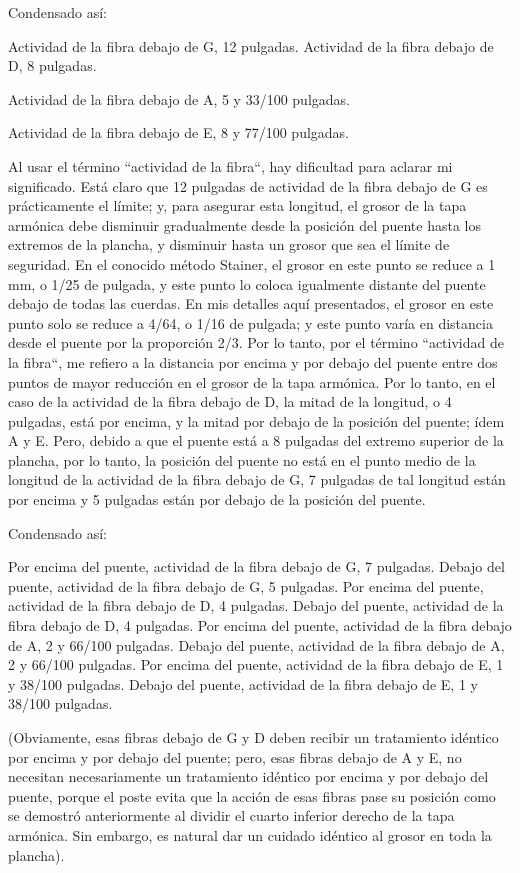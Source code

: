 \documentclass[12pt]{book}
\begin{document}
Condensado así:

Actividad de la fibra debajo de G, 12 pulgadas. Actividad de la fibra debajo de D, 8 pulgadas.

Actividad de la fibra debajo de A, 5 y 33/100 pulgadas.

Actividad de la fibra debajo de E, 8 y 77/100 pulgadas.

Al usar el término ``actividad de la fibra``, hay dificultad para aclarar mi significado. Está claro que 12 pulgadas de actividad de la fibra debajo de G es prácticamente el límite; y, para asegurar esta longitud, el grosor de la tapa armónica debe disminuir gradualmente desde la posición del puente hasta los extremos de la plancha, y disminuir hasta un grosor que sea el límite de seguridad. En el conocido método Stainer, el grosor en este punto se reduce a 1 mm, o 1/25 de pulgada, y este punto lo coloca igualmente distante del puente debajo de todas las cuerdas. En mis detalles aquí presentados, el grosor en este punto solo se reduce a 4/64, o 1/16 de pulgada; y este punto varía en distancia desde el puente por la proporción 2/3. Por lo tanto, por el término ``actividad de la fibra``, me refiero a la distancia por encima y por debajo del puente entre dos puntos de mayor reducción en el grosor de la tapa armónica. Por lo tanto, en el caso de la actividad de la fibra debajo de D, la mitad de la longitud, o 4 pulgadas, está por encima, y la mitad por debajo de la posición del puente; ídem A y E. Pero, debido a que el puente está a 8 pulgadas del extremo superior de la plancha, por lo tanto, la posición del puente no está en el punto medio de la longitud de la actividad de la fibra debajo de G, 7 pulgadas de tal longitud están por encima y 5 pulgadas están por debajo de la posición del puente.

Condensado así:

Por encima del puente, actividad de la fibra debajo de G, 7 pulgadas. Debajo del puente, actividad de la fibra debajo de G, 5 pulgadas. Por encima del puente, actividad de la fibra debajo de D, 4 pulgadas. Debajo del puente, actividad de la fibra debajo de D, 4 pulgadas. Por encima del puente, actividad de la fibra debajo de A, 2 y 66/100 pulgadas. Debajo del puente, actividad de la fibra debajo de A, 2 y 66/100 pulgadas. Por encima del puente, actividad de la fibra debajo de E, 1 y 38/100 pulgadas. Debajo del puente, actividad de la fibra debajo de E, 1 y 38/100 pulgadas.

(Obviamente, esas fibras debajo de G y D deben recibir un tratamiento idéntico por encima y por debajo del puente; pero, esas fibras debajo de A y E, no necesitan necesariamente un tratamiento idéntico por encima y por debajo del puente, porque el poste evita que la acción de esas fibras pase su posición como se demostró anteriormente al dividir el cuarto inferior derecho de la tapa armónica. Sin embargo, es natural dar un cuidado idéntico al grosor en toda la plancha).
\end{document}
